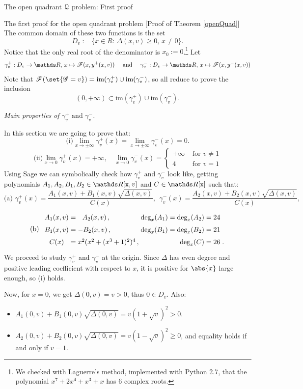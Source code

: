 \documentclass[11pt, a4paper, english, twoside, notitlepage, openright]{report}
\begin{document}
\begin{chapter}{The open quadrant $\mathcal{Q}$ problem: First proof}
\begin{section}{The first proof for the open quadrant problem} [Proof of Theorem \ref{openQuad}]
The common domain of these two functions is the set 
$$
D_v:=\{x\in R:\, \Delta(x,v)\geq 0,\,x\neq 0\}.
$$ 
Notice that the only real root of the denominator is $x_0:=0$.\footnote{We checked with Laguerre's method, implemented with Python 2.7, that the polynomial $x^7+2x^4+x^3+x$ has 6 complex roots.} Let
$$
\gamma_v^+: D_v\to\R,\, x\mapsto\F(x,y^+(x,v))\quad\text{ and }\quad\gamma_v^-:D_v\to\R,\, x\mapsto\F(x,y^-(x,v))
$$
Note that $\F(\set{\G=v})=\text{im}(\gamma_v^+)\cup\text{im}(\gamma_v^-)$, so all reduce to prove the inclusion 
$$
(0,+\infty)\subset\text{im}(\gamma_v^+)\cup\text{im}(\gamma_v^-).
$$
\begin{center}
 \emph{Main properties of $\gamma_v^+ \text{ and } \gamma_v^-$.}
\end{center}\label{step2}
In this section we are going to prove that:
$$
\text{(i)} \lim_{x\rightarrow \pm\infty}\gamma_v^+(x)=\lim_{x\rightarrow \pm\infty}\gamma_v^-(x)=0.
$$
$$\text{(ii)} \lim_{x\rightarrow 0}\gamma_v^+(x)=+\infty
,\quad \lim_{x\rightarrow 0}\gamma_v^-(x)=\left\{\begin{array}{ll}
+\infty&\text{ for $v\neq 1$}\\
 4 & \text{ for $v=1$}
\end{array} \right.
$$
Using Sage we can symbolically check how $\gamma_v^+\text{ and }\gamma_v^-$ look like, getting polynomials $A_1,A_2,B_1,B_2\in\R[{\tt x},v]$ and $C\in\R[{\tt x}]$ such that:
$$\text{(a) }\gamma_v^+(x)=\dfrac{A_1(x,v)+B_1(x,v)\sqrt{\Delta(x,v)}}{C(x)}, \ \ 
\gamma_v^-(x)=\dfrac{A_2(x,v)+B_2(x,v)\sqrt{\Delta(x,v)}}{C(x)},$$
$$
\text{(b)}\ \ 
\arraycolsep=1.4pt\def\arraystretch{1.5}
\begin{array}{cclrl}
A_1(x,v)&=&\ \ A_2(x,v)\, , & \text{deg}_x(A_1)=\text{deg}_x(A_2)=24& \\
B_1(x,v)&=&-B_2(x,v)\, , &\text{deg}_x(B_1)=\text{deg}_x(B_2)=21& \\
C(x)&=&x^2(x^2+(x^3+1)^2)^4\, , & \text{deg}_x(C)=26&.
\end{array}
$$
We proceed to study $\gamma_v^+$ and $\gamma_v^-$ at the origin. Since $\Delta$ has even degree and positive leading coefficient with respect to $x$, it is positive for $\abs{x}$ large enough, so (i) holds.
			
Now, for $x=0$, we get $\Delta(0,v)=v>0$, thus $0\in\overline{D_v}$. Also:
\begin{itemize}
\item $A_1(0,v)+B_1(0,v) \sqrt{\Delta(0,v)}= v(1+\sqrt{v})^2>0$.
				\item $A_2(0,v)+B_2(0,v)\sqrt{\Delta(0,v)}=v(1-\sqrt{v})^2\geq 0$, and equality holds if and only if $v=1$.
\end{itemize}
			

\end{section}
\end{chapter}
\end{document}
